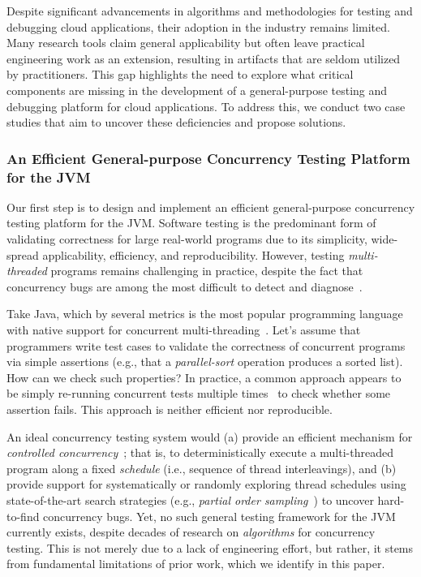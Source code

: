 Despite significant advancements in algorithms and methodologies for testing and debugging cloud applications, their adoption in the industry remains limited. Many research tools claim general applicability but often leave practical engineering work as an extension, resulting in artifacts that are seldom utilized by practitioners.  This gap highlights the need to explore what critical components are missing in the development of a general-purpose testing and debugging platform for cloud applications. To address this, we conduct two case studies that aim to uncover these deficiencies and propose solutions.


\subsubsection{An Efficient General-purpose Concurrency Testing Platform for the JVM}

Our first step is to design and implement an efficient general-purpose concurrency testing platform for the JVM. Software testing is the predominant form of validating correctness for large real-world programs due to its simplicity, wide-spread applicability, efficiency, and reproducibility. However, testing \emph{multi-threaded} programs remains challenging in practice, despite the fact that concurrency bugs are among the most difficult to detect and diagnose~\cite{Lu08-bug-study, Musuvathi08-chess}. 


Take Java, which by several metrics is the most popular programming language with native support for concurrent multi-threading~\cite{pl-stackoverflow, pl-github, pl-tiobe}. Let's assume that programmers write test cases to validate the correctness of concurrent programs via simple assertions (e.g., that a \emph{parallel-sort} operation produces a sorted list). How can we check such properties? In practice, a common approach appears to be simply re-running concurrent tests multiple times~\cite{baeldung-testing-multithreaded} to check whether some assertion fails. This approach is neither efficient nor reproducible.

An ideal concurrency testing system would (a) provide an efficient mechanism for \emph{controlled concurrency}~\cite{Thomson16-sctbench}; that is, to deterministically execute a multi-threaded program along a fixed  \emph{schedule} (i.e., sequence of thread interleavings), and (b) provide support for systematically or randomly exploring thread schedules using state-of-the-art search strategies (e.g., \emph{partial order sampling}~\cite{Yuan18-POS}) to uncover hard-to-find concurrency bugs. Yet, no such general testing framework for the JVM currently exists, despite decades of research on \emph{algorithms} for concurrency testing. This is not merely due to a lack of engineering effort, but rather, it stems from fundamental limitations of prior work, which we identify in this paper.

